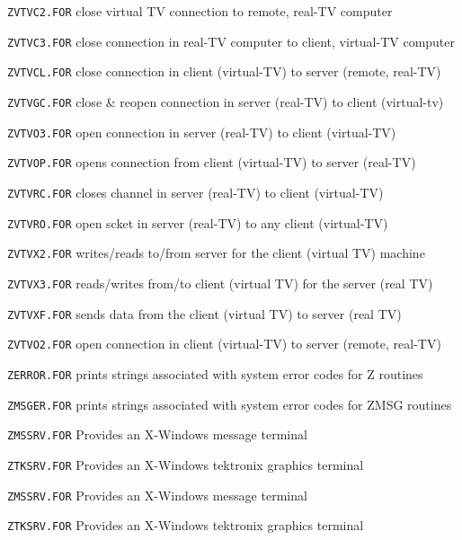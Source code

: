 {\item{\tt ZVTVC2.FOR} close virtual TV connection to remote, real-TV computer
\item{\tt ZVTVC3.FOR} close connection in real-TV computer to client, virtual-TV computer
\item{\tt ZVTVCL.FOR} close connection in client (virtual-TV) to server (remote, real-TV)
\item{\tt ZVTVGC.FOR} close \& reopen connection in server (real-TV) to client (virtual-tv)
\item{\tt ZVTVO3.FOR} open connection in server (real-TV) to client (virtual-TV)
\item{\tt ZVTVOP.FOR} opens connection from client (virtual-TV) to server (real-TV)
\item{\tt ZVTVRC.FOR} closes channel in server (real-TV) to client (virtual-TV)
\item{\tt ZVTVRO.FOR} open scket in server (real-TV) to any client (virtual-TV)
\item{\tt ZVTVX2.FOR} writes/reads to/from server for the client (virtual TV) machine
\item{\tt ZVTVX3.FOR} reads/writes from/to client (virtual TV) for the server (real TV)
\item{\tt ZVTVXF.FOR} sends data from the client (virtual TV) to server (real TV)

\medskip

\item{\tt ZVTVO2.FOR} open connection in client (virtual-TV) to server (remote, real-TV)

\medskip

\item{\tt ZERROR.FOR} prints strings associated with system error codes for Z routines
\item{\tt ZMSGER.FOR} prints strings associated with system error codes for ZMSG routines
\item{\tt ZMSSRV.FOR} Provides an X-Windows message terminal
\item{\tt ZTKSRV.FOR} Provides an X-Windows tektronix graphics terminal

\medskip

\item{\tt ZMSSRV.FOR} Provides an X-Windows message terminal
\item{\tt ZTKSRV.FOR} Provides an X-Windows tektronix graphics terminal

\medskip

}
